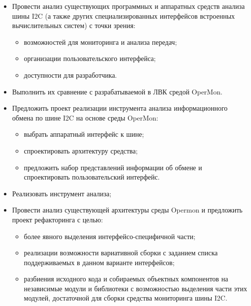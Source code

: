 \begin{itemize}
 \item Провести анализ существующих программных и аппаратных средств анализа шины I2C (а также других специализированных интерфейсов встроенных вычислительных систем) с точки зрения:
 
 \begin{itemize}
  \item возможностей для мониторинга и анализа передач;
  \item организации пользовательского интерфейса;
  \item доступности для разработчика.
 \end{itemize}
 
 \item Выполнить их сравнение с разрабатываемой в ЛВК средой OperMon.
 
 \item Предложить проект реализации инструмента анализа информационного обмена по шине I2C на основе среды OperMon:
 
 \begin{itemize}
  \item выбрать аппаратный интерфейс к шине;
  \item спроектировать архитектуру средства;
  \item предложить набор представлений информации об обмене и спроектировать пользовательский интерфейс.
 \end{itemize}

 
 \item Реализовать инструмент анализа;
 
 \item Провести анализ существующей архитектуры среды Opermon и предложить проект рефакторинга с целью:
 
 \begin{itemize}
  \item более явного выделения интерфейсо-специфичной части;
  \item реализации возможности вариативной сборки с заданием списка поддерживаемых в данном варианте интерфейсов;
  \item разбиения исходного кода и собираемых объектных компонентов на независимые модули и библиотеки с возможностью выделения части этих модулей, достаточной для сборки средства мониторинга шины I2C.
 \end{itemize}
 
\end{itemize}
